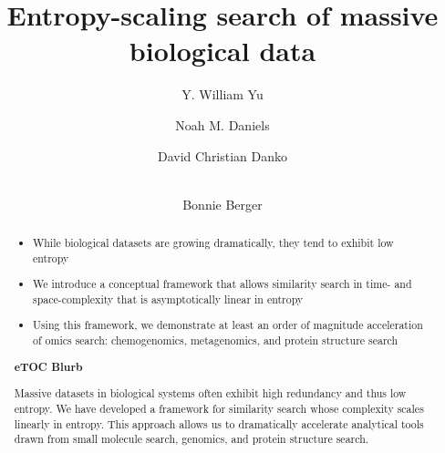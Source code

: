 \documentclass[review,preprint,12pt]{elsarticle}
\theoremstyle{definition}
\theoremstyle{remark}
\numberwithin{equation}{section}
\begin{document}
\begin{frontmatter}

\title{ %
Entropy-scaling search of massive biological data}

\author[mitmath,mitcsail]{Y. William Yu}
\author[mitmath,mitcsail]{Noah M. Daniels}
\author[mitcsail]{David Christian Danko}
\author[mitmath,mitcsail]{\\Bonnie Berger}
\address[mitmath]{Department of Mathematics, Massachusetts Institute of Technology, Cambridge, Massachusetts 02139}
\address[mitcsail]{Computer Science and AI Lab, Massachusetts Institute of Technology, Cambridge, Massachusetts 02139}






\begin{abstract}
    \begin{itemize}
        \item While biological datasets are growing dramatically, they tend to exhibit low entropy
        \item We introduce a conceptual framework that allows similarity search in time- and space-complexity that is asymptotically linear in entropy
        \item Using this framework, we demonstrate at least an order of magnitude acceleration of omics search: chemogenomics, metagenomics, and protein structure search
    \end{itemize}
\noindent\unskip\textbf{eTOC Blurb}
\par\medskip\noindent\unskip\ignorespaces
Massive datasets in biological systems often exhibit high redundancy and thus low entropy.
We have developed a framework for similarity search whose complexity scales linearly in entropy.
This approach allows us to dramatically accelerate analytical tools drawn from small molecule search, genomics, and protein structure search.
\end{abstract}

\end{frontmatter}
\end{document}
